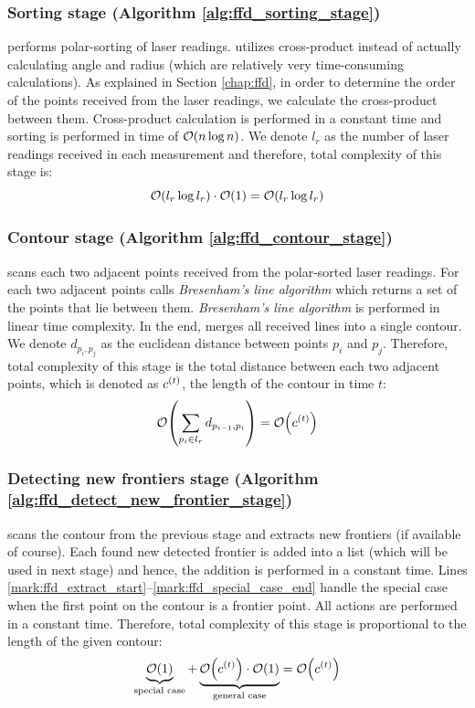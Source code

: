 \subsubsection{Sorting stage (Algorithm \ref{alg:ffd_sorting_stage})}
\FFD performs polar-sorting of laser readings. 
\FFD utilizes cross-product instead of actually
calculating angle and radius (which are relatively
very time-consuming calculations). As explained in Section
\ref{chap:ffd}, in order to determine the order of the points
received from the laser readings, we calculate the cross-product between
them. Cross-product calculation is performed in a constant time and
sorting is performed in time of $\mathcal{O}{\left(n\log{n}\right)}$. We denote $l_r$ as
the number of laser readings received in each measurement and therefore, total
complexity of this stage is:
 \begin{equation}\label{eq:sorting}
 	\mathcal{O}{\left(l_r\log{l_r}\right)} \cdot \mathcal{O}{\left(1\right)} = \mathcal{O}{\left(l_r \log{l_r}\right)}
 \end{equation}

\subsubsection{Contour stage (Algorithm \ref{alg:ffd_contour_stage})}
\FFD scans each two adjacent points received from the polar-sorted laser
readings. For each two adjacent points \FFD calls \emph{Bresenham's line algorithm} which returns
a set of the points that lie between them. \emph{Bresenham's line algorithm} is
performed in linear time complexity. In the end, \FFD merges all received lines
into a single contour. We denote $d_{p_i,p_j}$ as the euclidean distance
between points $p_i$ and $p_j$. Therefore, total complexity of this stage is
the total distance between each two adjacent points, which is denoted as
$c^{\left(t\right)}$, the length of the contour in time $t$:
\begin{equation}\label{eq:contour}
\mathcal{O}{\left(\sum_{p_i \in l_r}{d_{p_{i-1},p_i}}\right)} = \mathcal{O}{\left(c^{\left(t\right)}\right)}
\end{equation}

\subsubsection{Detecting new frontiers stage (Algorithm
\ref{alg:ffd_detect_new_frontier_stage})}
\FFD scans the contour from the previous stage and extracts new frontiers (if
available of course).
Each found new detected frontier is added into a list (which will be used in
next stage) and hence, the addition is performed in a constant time. Lines
\ref{mark:ffd_extract_start}--\ref{mark:ffd_special_case_end} handle the
special case when the first point on the contour is a frontier point. All
actions are performed in a constant time. Therefore, total complexity of this
stage is proportional to the length of the given contour:
\begin{equation}\label{eq:detection}
	\underbrace{\mathcal{O}{\left(1\right)}}_{\textrm{special case}} +
	\underbrace{\mathcal{O}{\left(c^{\left(t\right)}\right)} \cdot \mathcal{O}{\left(1\right)}}_{\textrm{general case}} =
	\mathcal{O}{\left(c^{\left(t\right)}\right)}
\end{equation}

